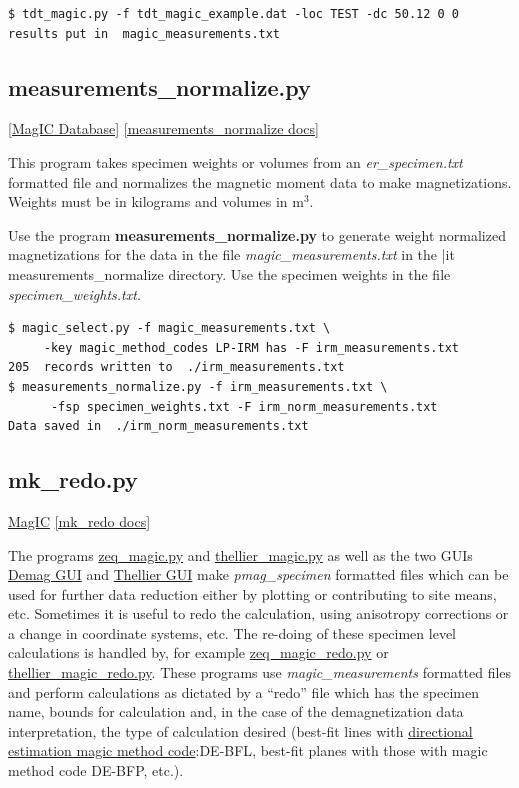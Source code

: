 \documentclass[11pt]{book}
\begin{document}
{{{{\begin{verbatim}
$ tdt_magic.py -f tdt_magic_example.dat -loc TEST -dc 50.12 0 0
results put in  magic_measurements.txt
\end{verbatim}


\subsection{measurements\_normalize.py}
\href{#MagICDatabase}{[MagIC Database]}
\href{https://github.com/PmagPy/PmagPy/blob/master/programs/measurements_normalize.py}{[measurements\_normalize docs]}

This program takes specimen weights or volumes from an {\it er\_specimen.txt} formatted file and normalizes the magnetic moment data to make  magnetizations.  Weights must be in kilograms and volumes in m$^3$.

Use the program {\bf measurements\_normalize.py} to generate weight normalized magnetizations for the data in the file {\it magic\_measurements.txt} in the {|it measurements\_normalize} directory.  Use the specimen weights in the file {\it specimen\_weights.txt}.

\begin{verbatim}
$ magic_select.py -f magic_measurements.txt \
     -key magic_method_codes LP-IRM has -F irm_measurements.txt
205  records written to  ./irm_measurements.txt
$ measurements_normalize.py -f irm_measurements.txt \
      -fsp specimen_weights.txt -F irm_norm_measurements.txt
Data saved in  ./irm_norm_measurements.txt
\end{verbatim}


\subsection{mk\_redo.py}
\href{#MagIC}{MagIC}
\href{https://github.com/PmagPy/PmagPy/blob/master/programs/mk_redo.py}{[mk\_redo docs]}

The programs \href{#zeq_magic.py}{zeq\_magic.py} and \href{#thellier_magic.py}{thellier\_magic.py} as well as the two GUIs \href{#demag_gui.py}{Demag GUI} and \href{#thellier_gui.py}{Thellier GUI} make {\it pmag\_specimen} formatted files which can be used for further data reduction either by plotting or contributing to site means, etc.  Sometimes it is useful to redo the calculation, using anisotropy corrections or a change in coordinate systems, etc.  The re-doing of these specimen level calculations is handled by, for example \href{#zeq_magic_redo.py}{zeq\_magic\_redo.py} or \href{#thellier_magic_redo.py}{ thellier\_magic\_redo.py}.  These programs use {\it magic\_measurements} formatted files and perform calculations as dictated by a ``redo'' file which has the specimen name, bounds for calculation and, in the case of the demagnetization data interpretation, the type of calculation desired (best-fit lines with \href{http://earthref.org/cgi-bin/magic-s1-methods.cgi?database_name=magic\qquad &search_start=methods\qquad &category=Direction%20Estimation}{directional estimation magic method code}:{DE-BFL}, best-fit planes with those with  magic method code DE-BFP, etc.).

}}}}
\end{document}
